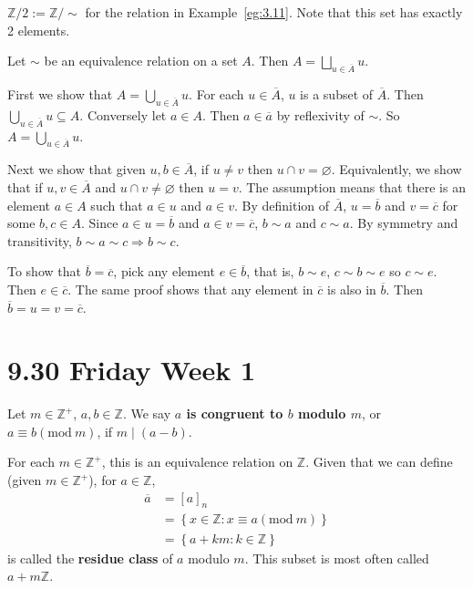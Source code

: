 \documentclass{notes}
\begin{document}
\begin{defn}
  $\mathbb Z / 2 := \mathbb Z / \sim$ for the relation in Example~\ref{eg:3.11}.
  Note that this set has exactly 2 elements.
\end{defn}

\begin{prop}
  Let $\sim$ be an equivalence relation on a set $A$.
  Then $A = \bigsqcup_{u \in \overline A} u$.
\end{prop}

\begin{prf}
  First we show that $A = \bigcup_{u \in \overline A} u$.
  For each $u \in \overline A$, $u$ is a subset of $\overline A$.
  Then $\bigcup_{u \in \overline A} u \subseteq A$.
  Conversely let $a \in A$.
  Then $a \in \overline a$ by reflexivity of $\sim$.
  So $A = \bigcup_{u \in \overline A} u$.

  Next we show that given $u, b \in \overline A$, if $u \neq v$ then $u \cap v = \varnothing$.
  Equivalently, we show that if $u, v \in \overline A$ and $u \cap v \neq \varnothing$ then $u = v$.
  The assumption means that there is an element $a \in A$ such that $a \in u$ and $a \in v$.
  By definition of $\overline A$, $u = \overline b$ and $v = \overline c$ for some $b, c \in A$.
  Since $a \in u = \overline b$ and $a \in v = \overline c$, $b \sim a$ and $c \sim a$.
  By symmetry and transitivity, $b \sim a \sim c \Rightarrow b \sim c$.
  
  To show that $\overline b = \overline c$, pick any element $e \in \overline b$, that is, $b \sim e$, $c \sim b \sim e$ so $c \sim e$.
  Then $e \in \overline c$.
  The same proof shows that any element in $\overline c$ is also in $\overline b$.
  Then $\overline b = u = v = \overline c$.
\end{prf}

\newpage

\section{9.30 Friday Week 1}

\underline{}

\begin{defn}
  Let $m \in \mathbb Z^+$, $a, b \in \mathbb Z$.
  We say {\boldmath \bfseries $a$ is congruent to $b$ modulo $m$}, or $a \equiv b (\mathrm{mod}\ m)$, if $m \mid (a - b)$.

  For each $m \in \mathbb Z^+$, this is an equivalence relation on $\mathbb Z$.
  Given that we can define (given $m \in \mathbb Z^+$), for $a \in \mathbb Z$, 
  \begin{align*}
    \overline a &= [a]_n \\ 
    &= \left \{ x \in \mathbb Z : x \equiv a (\mathrm{mod}\ m) \right \} \\ 
    &= \left \{ a + k m : k \in \mathbb Z \right \}
  \end{align*}
  is called the {\boldmath \bfseries residue class} of $a$ modulo $m$.
  This subset is most often called $a + m \mathbb Z$.
\end{defn}
\end{document}
